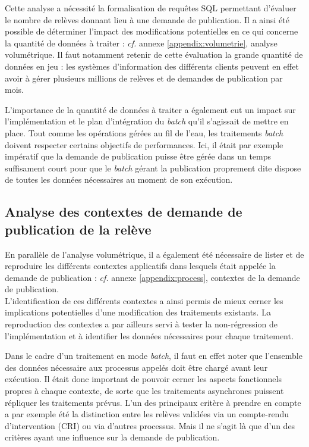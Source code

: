 \documentclass[a4paper, 12pt]{report}
\begin{document}
Cette analyse a nécessité la formalisation de requêtes SQL permettant d'évaluer le nombre de relèves donnant lieu à une demande de publication. Il a ainsi été possible de déterminer l'impact des modifications potentielles en ce qui concerne la quantité de données à traiter : \textit{cf.} annexe \ref{appendix:volumetrie}, analyse volumétrique. Il faut notamment retenir de cette évaluation la grande quantité de données en jeu : les systèmes d'information des différents clients peuvent en effet avoir à gérer plusieurs millions de relèves et de demandes de publication par mois.

L'importance de la quantité de données à traiter a également eut un impact sur l'implémentation et le plan d'intégration du \textit{batch} qu'il s'agissait de mettre en place. Tout comme les opérations gérées au fil de l'eau, les traitements \textit{batch} doivent respecter certains objectifs de performances. Ici, il était par exemple impératif que la demande de publication puisse être gérée dans un temps suffisament court pour que le \textit{batch} gérant la publication proprement dite dispose de toutes les données nécessaires au moment de son exécution.

\subsection{Analyse des contextes de demande de publication de la relève}

En parallèle de l'analyse volumétrique, il a également été nécessaire de lister et de reproduire les différents contextes applicatifs dans lesquels était appelée la demande de publication : \textit{cf.} annexe \ref{appendix:process}, contextes de la demande de publication.\\

L'identification de ces différents contextes a ainsi permis de mieux cerner les implications potentielles d'une modification des traitements existants. La reproduction des contextes a par ailleurs servi à tester la non-régression de l'implémentation et à identifier les données nécessaires pour chaque traitement. 

Dans le cadre d'un traitement en mode \textit{batch}, il faut en effet noter que l'ensemble des données nécessaire aux processus appelés doit être chargé avant leur exécution. Il était donc important de pouvoir cerner les aspects fonctionnels propres à chaque contexte, de sorte que les traitements asynchrones puissent répliquer les traitements prévus. L'un des principaux critère à prendre en compte a par exemple été la distinction entre les relèves validées via un compte-rendu d'intervention (CRI) ou via d'autres processus. Mais il ne s'agit là que d'un des critères ayant une influence sur la demande de publication.
\end{document}
